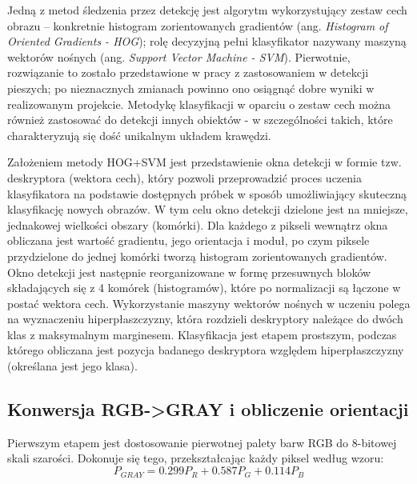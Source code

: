 Jedną z metod śledzenia przez detekcję jest algorytm wykorzystujący zestaw cech obrazu -- konkretnie histogram zorientowanych gradientów (ang. \textit{Histogram of Oriented Gradients - HOG}); rolę decyzyjną pełni klasyfikator nazywany maszyną wektorów nośnych (ang. \textit{Support Vector Machine - SVM}). %
Pierwotnie, rozwiązanie to zostało przedstawione w pracy \cite{Dalal} z zastosowaniem w detekcji pieszych; po nieznacznych zmianach powinno ono osiągnąć dobre wyniki w realizowanym projekcie. %
Metodykę klasyfikacji w oparciu o zestaw cech można również zastosować do detekcji innych obiektów - w szczególności takich, które charakteryzują się dość unikalnym układem krawędzi.

Założeniem metody HOG+SVM jest przedstawienie okna detekcji w formie tzw. deskryptora (wektora cech), który pozwoli przeprowadzić proces uczenia klasyfikatora na podstawie dostępnych próbek w sposób umożliwiający skuteczną klasyfikację nowych obrazów. W tym celu okno detekcji dzielone jest na mniejsze, jednakowej wielkości obszary (komórki). Dla każdego z pikseli wewnątrz okna obliczana jest wartość gradientu, jego orientacja i moduł, po czym piksele przydzielone do jednej komórki tworzą histogram zorientowanych gradientów. Okno detekcji jest następnie reorganizowane w formę przesuwnych bloków składających się z 4 komórek (histogramów), które po normalizacji są łączone w postać wektora cech.\newline
Wykorzystanie maszyny wektorów nośnych w uczeniu polega na wyznaczeniu hiperpłaszczyzny, która rozdzieli deskryptory należące do dwóch klas z maksymalnym marginesem. Klasyfikacja jest etapem prostszym, podczas którego obliczana jest pozycja badanego deskryptora względem hiperpłaszczyzny (określana jest jego klasa).


\subsection{Konwersja RGB->GRAY i obliczenie orientacji} %
\label{sec:HOGgrad}
Pierwszym etapem jest dostosowanie pierwotnej palety barw RGB do 8-bitowej skali szarości. 
Dokonuje się tego, przekształcając każdy piksel według wzoru:
\begin{equation}
\label{eq:rgb2gray}
P_{GRAY}=0.299P_R + 0.587P_G + 0.114P_B 
\end{equation}

